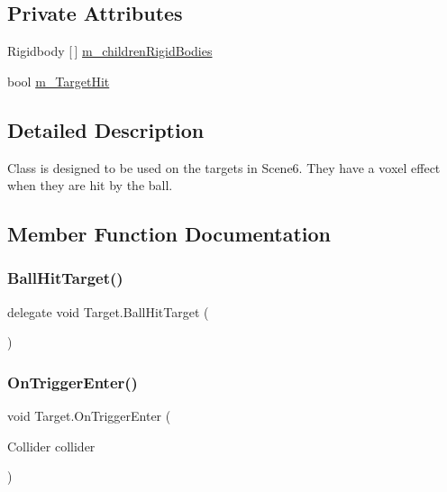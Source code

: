 \subsection*{Private Attributes}
\begin{DoxyCompactItemize}
\item 
Rigidbody \mbox{[}$\,$\mbox{]} \mbox{\hyperlink{class_target_a570a932db2872d5f0d00656f038c2f21}{m\+\_\+children\+Rigid\+Bodies}}
\item 
bool \mbox{\hyperlink{class_target_abfdb205d5c2872d5d983b4e617eb5e40}{m\+\_\+\+Target\+Hit}}
\end{DoxyCompactItemize}


\subsection{Detailed Description}
Class is designed to be used on the targets in Scene6. They have a voxel effect when they are hit by the ball. 



\subsection{Member Function Documentation}
\mbox{\label{class_target_a4f2a0b66fecc85bdcf301cc9ab926898}} 
\subsubsection{\texorpdfstring{Ball\+Hit\+Target()}{BallHitTarget()}}
{\footnotesize\ttfamily delegate void Target.\+Ball\+Hit\+Target (\begin{DoxyParamCaption}{ }\end{DoxyParamCaption})}

\mbox{\label{class_target_adac88a907571e0494bbafc363236a84e}} 
\subsubsection{\texorpdfstring{On\+Trigger\+Enter()}{OnTriggerEnter()}}
{\footnotesize\ttfamily void Target.\+On\+Trigger\+Enter (\begin{DoxyParamCaption}\item[{Collider}]{collider }\end{DoxyParamCaption})\hspace{0.3cm}{\ttfamily [private]}}

